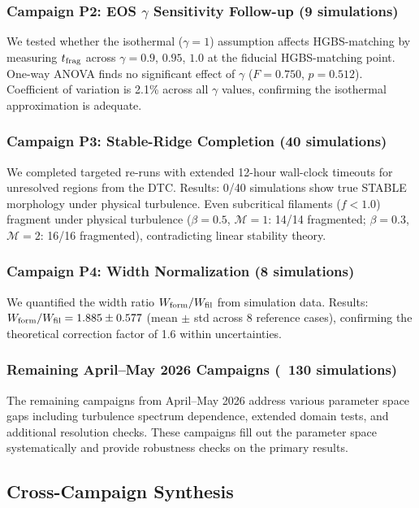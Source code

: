 \documentclass[twocolumn]{mnras}
\begin{document}
\subsubsection{Campaign P2: EOS $\gamma$ Sensitivity Follow-up (9 simulations)}

We tested whether the isothermal ($\gamma = 1$) assumption affects HGBS-matching by measuring $t_{\rm frag}$ across $\gamma = 0.9$, $0.95$, $1.0$ at the fiducial HGBS-matching point. One-way ANOVA finds no significant effect of $\gamma$ ($F = 0.750$, $p = 0.512$). Coefficient of variation is 2.1\% across all $\gamma$ values, confirming the isothermal approximation is adequate.

\subsubsection{Campaign P3: Stable-Ridge Completion (40 simulations)}

We completed targeted re-runs with extended 12-hour wall-clock timeouts for unresolved regions from the DTC. Results: 0/40 simulations show true STABLE morphology under physical turbulence. Even subcritical filaments ($f < 1.0$) fragment under physical turbulence ($\beta = 0.5$, $\mathcal{M} = 1$: 14/14 fragmented; $\beta = 0.3$, $\mathcal{M} = 2$: 16/16 fragmented), contradicting linear stability theory.

\subsubsection{Campaign P4: Width Normalization (8 simulations)}

We quantified the width ratio $W_{\rm form}/W_{\rm fil}$ from simulation data. Results: $W_{\rm form}/W_{\rm fil} = 1.885 \pm 0.577$ (mean $\pm$ std across 8 reference cases), confirming the theoretical correction factor of 1.6 within uncertainties.

\subsubsection{Remaining April--May 2026 Campaigns (~130 simulations)}

The remaining campaigns from April--May 2026 address various parameter space gaps including turbulence spectrum dependence, extended domain tests, and additional resolution checks. These campaigns fill out the parameter space systematically and provide robustness checks on the primary results.

\subsection{Cross-Campaign Synthesis}
\end{document}
